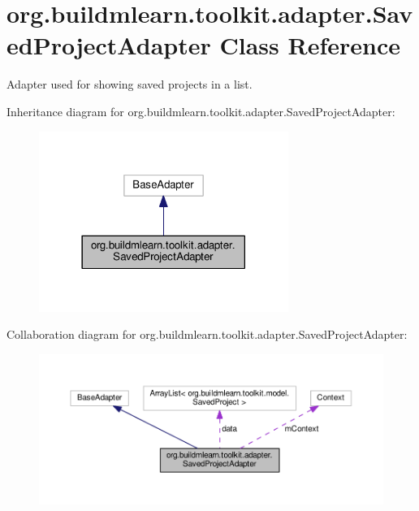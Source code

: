 \hypertarget{classorg_1_1buildmlearn_1_1toolkit_1_1adapter_1_1SavedProjectAdapter}{}\section{org.\+buildmlearn.\+toolkit.\+adapter.\+Saved\+Project\+Adapter Class Reference}
\label{classorg_1_1buildmlearn_1_1toolkit_1_1adapter_1_1SavedProjectAdapter}


Adapter used for showing saved projects in a list.  




Inheritance diagram for org.\+buildmlearn.\+toolkit.\+adapter.\+Saved\+Project\+Adapter\+:
\nopagebreak
\begin{figure}[H]
\begin{center}
\leavevmode
\includegraphics[width=230pt]{classorg_1_1buildmlearn_1_1toolkit_1_1adapter_1_1SavedProjectAdapter__inherit__graph}
\end{center}
\end{figure}


Collaboration diagram for org.\+buildmlearn.\+toolkit.\+adapter.\+Saved\+Project\+Adapter\+:
\nopagebreak
\begin{figure}[H]
\begin{center}
\leavevmode
\includegraphics[width=350pt]{classorg_1_1buildmlearn_1_1toolkit_1_1adapter_1_1SavedProjectAdapter__coll__graph}
\end{center}
\end{figure}

